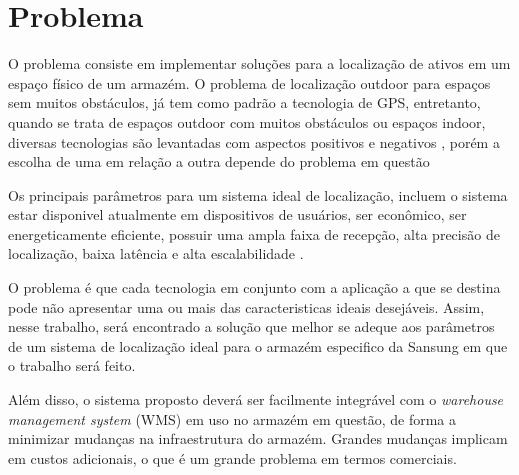 \chapter{Problema}
\textual
O problema consiste em implementar soluções para a localização de ativos em um espaço físico de um armazém.
O problema de localização outdoor para espaços sem muitos obstáculos, já tem como padrão a tecnologia de GPS, entretanto, quando se trata de espaços outdoor com muitos obstáculos ou espaços indoor, diversas tecnologias são levantadas com aspectos positivos e negativos \cite{art4}, porém a escolha de uma em relação a outra depende do problema em questão

Os principais parâmetros para um sistema ideal de localização, incluem o sistema estar disponivel atualmente em dispositivos de usuários, ser econômico, ser energeticamente eficiente, possuir uma ampla faixa de recepção, alta precisão de localização, baixa latência e alta escalabilidade \cite{art2}.

O problema é que cada tecnologia em conjunto com a aplicação a que se destina pode não apresentar uma ou mais das caracteristicas ideais desejáveis. Assim, nesse trabalho, será encontrado a solução que melhor se adeque aos parâmetros de um sistema de localização ideal para o armazém especifico da Sansung em que o trabalho será feito.

Além disso, o sistema proposto deverá ser facilmente integrável com o \textit{warehouse management system} (WMS) em uso no armazém em questão, de forma a minimizar mudanças na infraestrutura do armazém. Grandes mudanças implicam em custos adicionais, o que é um grande problema em termos comerciais.
